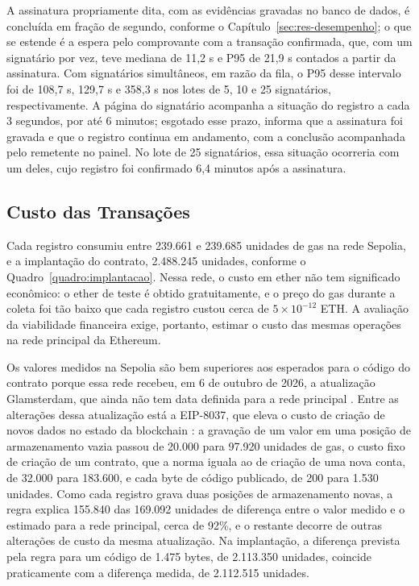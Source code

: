 \documentclass[
    12pt,
    a4paper,
    oneside,
    chapter=TITLE,
    section=TITLE,
    subsection=TITLE,
    subsubsection=TITLE,
    sumario=tradicional,
    english,
    brazil
]{abntex2}
\begin{document}
A assinatura propriamente dita, com as evidências gravadas no banco de dados, é concluída em fração de segundo, conforme o Capítulo~\ref{sec:res-desempenho}; o que se estende é a espera pelo comprovante com a transação confirmada, que, com um signatário por vez, teve mediana de 11,2 s e P95 de 21,9 s contados a partir da assinatura. Com signatários simultâneos, em razão da fila, o P95 desse intervalo foi de 108,7 s, 129,7 s e 358,3 s nos lotes de 5, 10 e 25 signatários, respectivamente. A página do signatário acompanha a situação do registro a cada 3 segundos, por até 6 minutos; esgotado esse prazo, informa que a assinatura foi gravada e que o registro continua em andamento, com a conclusão acompanhada pelo remetente no painel. No lote de 25 signatários, essa situação ocorreria com um deles, cujo registro foi confirmado 6,4 minutos após a assinatura.

\subsection{Custo das Transações}
\label{sec:res-custo}

Cada registro consumiu entre 239.661 e 239.685 unidades de gas na rede Sepolia, e a implantação do contrato, 2.488.245 unidades, conforme o Quadro~\ref{quadro:implantacao}. Nessa rede, o custo em ether não tem significado econômico: o ether de teste é obtido gratuitamente, e o preço do gas durante a coleta foi tão baixo que cada registro custou cerca de $5 \times 10^{-12}$ ETH. A avaliação da viabilidade financeira exige, portanto, estimar o custo das mesmas operações na rede principal da Ethereum.

Os valores medidos na Sepolia são bem superiores aos esperados para o código do contrato porque essa rede recebeu, em 6 de outubro de 2026, a atualização Glamsterdam, que ainda não tem data definida para a rede principal \cite{beiko2024}. Entre as alterações dessa atualização está a EIP-8037, que eleva o custo de criação de novos dados no estado da blockchain \cite{silva2025}: a gravação de um valor em uma posição de armazenamento vazia passou de 20.000 para 97.920 unidades de gas, o custo fixo de criação de um contrato, que a norma iguala ao de criação de uma nova conta, de 32.000 para 183.600, e cada byte de código publicado, de 200 para 1.530 unidades. Como cada registro grava duas posições de armazenamento novas, a regra explica 155.840 das 169.092 unidades de diferença entre o valor medido e o estimado para a rede principal, cerca de 92\%, e o restante decorre de outras alterações de custo da mesma atualização. Na implantação, a diferença prevista pela regra para um código de 1.475 bytes, de 2.113.350 unidades, coincide praticamente com a diferença medida, de 2.112.515 unidades.
\end{document}
